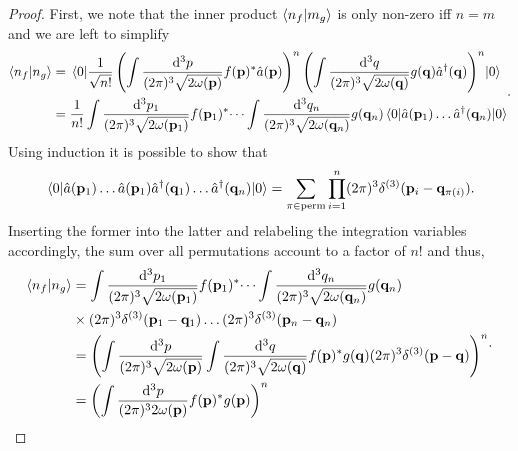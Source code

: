 \qkgnumberinnerproduct
\begin{proof}
	First, we note that the inner product $\braket{n_f}{m_g}$ is only non-zero iff $n=m$ and we are left to simplify
	\begin{equation*}
		\begin{split}
			\braket{n_f}{n_g}
			&=
			\expval{
				\frac{1}{\sqrt{n!}}
				\left(
					\int\frac{\dd[3]{p}}{(2\pi)^3\sqrt{2\omega(\vb{p})}}
					f(\vb{p})^*
					\hat{a}(\vb{p})
				\right)^n
				\left(
					\int\frac{\dd[3]{q}}{(2\pi)^3\sqrt{2\omega(\vb{q})}}
					g(\vb{q})
					\hat{a}^\dagger(\vb{q})
				\right)^n
			}{0}
			\\
			&=
			\frac{1}{n!}
			\int\frac{\dd[3]{p_1}}{(2\pi)^3\sqrt{2\omega(\vb{p}_1)}}
			f(\vb{p}_1)^*
			\dots
			\int\frac{\dd[3]{q_n}}{(2\pi)^3\sqrt{2\omega(\vb{q}_n)}}
			g(\vb{q}_n)
			\expval{
				\hat{a}(\vb{p}_1)
				\dots
				\hat{a}^\dagger(\vb{q}_n)
			}{0}
		\end{split}
		.
	\end{equation*}
	Using induction it is possible to show that
	\begin{equation*}
		\expval{
				\hat{a}(\vb{p}_1)
				\dots
				\hat{a}(\vb{p}_1)
				\hat{a}^\dagger(\vb{q}_1)
				\dots
				\hat{a}^\dagger(\vb{q}_n)
		}{0}
		=
		\sum_{\pi\in\textrm{perm}}
		\prod^n_{i=1}
		(2\pi)^3
		\delta^{(3)}(\vb{p}_i-\vb{q}_{\pi(i)})
		.
	\end{equation*}
	Inserting the former into the latter and relabeling the integration variables accordingly, the sum over all permutations account to a factor of $n!$ and thus,
	\begin{equation*}
		\begin{split}
			\braket{n_f}{n_g}
			&=
			\int\frac{\dd[3]{p_1}}{(2\pi)^3\sqrt{2\omega(\vb{p}_1)}}
			f(\vb{p}_1)^*
			\dots
			\int\frac{\dd[3]{q_n}}{(2\pi)^3\sqrt{2\omega(\vb{q}_n)}}
			g(\vb{q}_n)
			\\
			&\times
			(2\pi)^3
			\delta^{(3)}(\vb{p}_1-\vb{q}_1)
			\dots
			(2\pi)^3
			\delta^{(3)}(\vb{p}_n-\vb{q}_n)
			\\
			&=
			\left(
				\int\frac{\dd[3]{p}}{(2\pi)^3\sqrt{2\omega(\vb{p})}}
				\int\frac{\dd[3]{q}}{(2\pi)^3\sqrt{2\omega(\vb{q})}}
				f(\vb{p})^*
				g(\vb{q})
				(2\pi)^3
				\delta^{(3)}(\vb{p}-\vb{q})
			\right)^n
			\\
			&=
			\left(
				\int\frac{\dd[3]{p}}{(2\pi)^32\omega(\vb{p})}
				f(\vb{p})^*
				g(\vb{p})
			\right)^n
		\end{split}
		.
	\end{equation*}

\end{proof}
